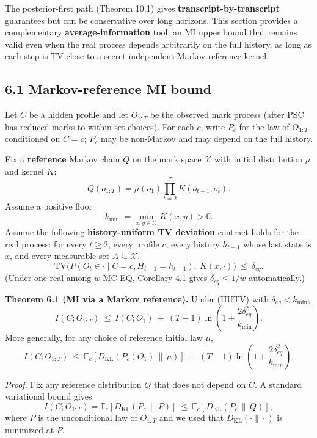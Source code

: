 \documentclass[11pt]{article}
\begin{document}
The posterior-first path (Theorem 10.1) gives
\textbf{transcript-by-transcript} guarantees but can be conservative
over long horizons. This section provides a complementary
\textbf{average-information} tool: an MI upper bound that remains valid
even when the real process depends arbitrarily on the full history, as
long as each step is TV-close to a secret-independent Markov reference
kernel.

\hypertarget{markov-reference-mi-bound}{%
\subsection{6.1 Markov-reference MI
bound}\label{markov-reference-mi-bound}}

Let \(C\) be a hidden profile and let \(O_{1:T}\) be the observed mark
process (after PSC has reduced marks to within-set choices). For each
\(c\), write \(P_c\) for the law of \(O_{1:T}\) conditioned on \(C=c\);
\(P_c\) may be non-Markov and may depend on the full history.

Fix a \textbf{reference} Markov chain \(Q\) on the mark space
\(\mathcal X\) with initial distribution \(\mu\) and kernel \(K\): \[
Q(o_{1:T})=\mu(o_1)\prod_{t=2}^T K(o_{t-1},o_t).
\] Assume a positive floor \[
k_{\min}:=\min_{x,y\in\mathcal X}K(x,y) > 0.
\] Assume the following \textbf{history-uniform TV deviation} contract
holds for the real process: for every \(t\ge 2\), every profile \(c\),
every history \(h_{t-1}\) whose last state is \(x\), and every
measurable set \(A\subseteq\mathcal X\), \[
\mathrm{TV}\bigl(P(O_t\in\cdot \mid C=c,H_{t-1}=h_{t-1}),\ K(x,\cdot)\bigr)\ \le\ \delta_{eq}.
\tag{HUTV}
\] (Under one-real-among-\(w\) MC-EQ, Corollary 4.1 gives
\(\delta_{eq}\le 1/w\) automatically.)

\textbf{Theorem 6.1 (MI via a Markov reference).} Under (HUTV) with
\(\delta_{eq}<k_{\min}\), \[
I(C;O_{1:T}) \ \le\ I(C;O_1)\ +\ (T-1)\ln\!\left(1+\frac{2\delta_{eq}^2}{k_{\min}}\right).
\] More generally, for any choice of reference initial law \(\mu\), \[
I(C;O_{1:T}) \ \le\ \mathbb E_c\!\left[D_{\mathrm{KL}}(P_c(O_1)\,\|\,\mu)\right]\ +\ (T-1)\ln\!\left(1+\frac{2\delta_{eq}^2}{k_{\min}}\right).
\]

\emph{Proof.} Fix any reference distribution \(Q\) that does not depend
on \(C\). A standard variational bound gives \[
I(C;O_{1:T}) = \mathbb E_c\!\left[D_{\mathrm{KL}}(P_c \,\|\, P)\right]\ \le\ \mathbb E_c\!\left[D_{\mathrm{KL}}(P_c \,\|\, Q)\right],
\] where \(P\) is the unconditional law of \(O_{1:T}\) and we used that
\(D_{\mathrm{KL}}(\cdot\|\cdot)\) is minimized at \(P\).
\end{document}
